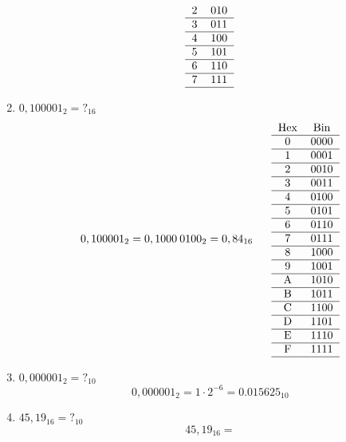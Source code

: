 \documentclass{article}
\begin{document}
\begin{enumerate}
$$\begin{tabular}{cc}
            2   & 010 \\
            \hline
            3   & 011 \\
            \hline
            4   & 100 \\
            \hline
            5   & 101 \\
            \hline
            6   & 110 \\
            \hline
            7   & 111 \\
            \hline
          \end{tabular}
        $$
  \item $ 0,100001_{2}     = ?_{16}$
        $$
          0,100001_{2} = 0,1000\:0100_{2} = 0,84_{16}
          \;\;\;\;\;\;\;\\
          \begin{tabular}{cc}
            Hex & Bin  \\
            \hline
            0   & 0000 \\
            \hline
            1   & 0001 \\
            \hline
            2   & 0010 \\
            \hline
            3   & 0011 \\
            \hline
            4   & 0100 \\
            \hline
            5   & 0101 \\
            \hline
            6   & 0110 \\
            \hline
            7   & 0111 \\
            \hline
            8   & 1000 \\
            \hline
            9   & 1001 \\
            \hline
            A   & 1010 \\
            \hline
            B   & 1011 \\
            \hline
            C   & 1100 \\
            \hline
            D   & 1101 \\
            \hline
            E   & 1110 \\
            \hline
            F   & 1111 \\
            \hline
          \end{tabular}
        $$
  \item $ 0,000001_{2}     = ?_{10}$
        $$  0,000001_{2} = 1\cdot2^{-6} = 0.015625_{10} $$
  \item $ 45,19_{16}       = ?_{10}$
        $$  45,19_{16} =
$$
\end{enumerate}
\end{document}
